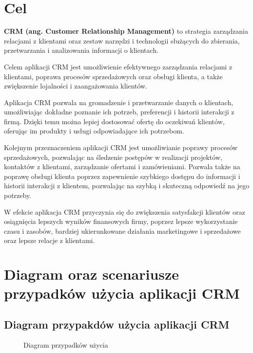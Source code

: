 \documentclass[12pt,a4paper]{article}
\begin{document}
\newpage

\section{Cel}

\vspace{12pt}\textbf{CRM (ang. Customer Relationship Management)} to strategia zarządzania relacjami z klientami oraz zestaw narzędzi i technologii służących do zbierania, przetwarzania i analizowania informacji o klientach.

\vspace{12pt}
Celem aplikacji CRM jest umożliwienie efektywnego zarządzania relacjami z klientami, poprawa procesów sprzedażowych oraz obsługi klienta, a także zwiększenie lojalności i zaangażowania klientów.

\vspace{12pt}
Aplikacja CRM pozwala na gromadzenie i przetwarzanie danych o klientach, umożliwiając dokładne poznanie ich potrzeb, preferencji i historii interakcji z firmą. Dzięki temu można lepiej dostosować ofertę do oczekiwań klientów, oferując im produkty i usługi odpowiadające ich potrzebom.

\vspace{12pt}
Kolejnym przeznaczeniem aplikacji CRM jest umożliwianie poprawy procesów sprzedażowych, pozwalając na śledzenie postępów w realizacji projektów, kontaktów z klientami, zarządzanie ofertami i zamówieniami. Pozwala także na poprawę obsługi klienta poprzez zapewnienie szybkiego dostępu do informacji i historii interakcji z klientem, pozwalając na szybką i skuteczną odpowiedź na jego potrzeby.

\vspace{12pt}
W efekcie aplikacja CRM przyczynia się do zwiększenia satysfakcji klientów oraz osiągnięcia lepszych wyników finansowych firmy, poprzez lepsze wykorzystanie czasu i zasobów, bardziej ukierunkowane działania marketingowe i sprzedażowe oraz lepsze relacje z klientami.

\newpage

\section{Diagram oraz scenariusze przypadków użycia aplikacji CRM}

\subsection{Diagram przypakdów użycia aplikacji CRM}
\begin{figure}[h]
  \centering
  \caption{Diagram przypadków użycia}
\end{figure}
\end{document}
